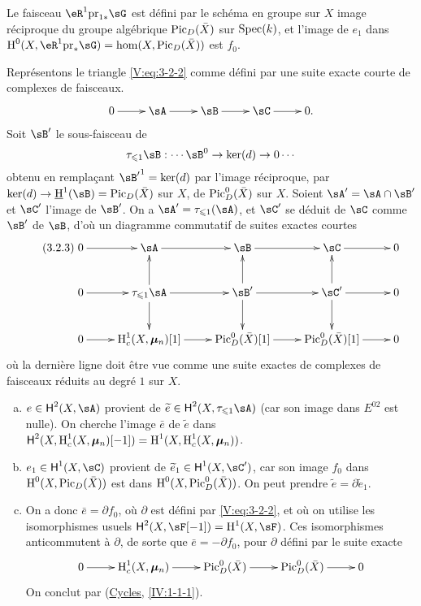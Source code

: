 Le faisceau $\eR^1\pr_{1\ast}\sG$ est défini par le schéma en 
groupe sur $X$ image réciproque du groupe algébrique $\operatorname{Pic}_D(\bar X)$ sur 
$\operatorname{Spec}(k)$, et l'image de $e_1$ dans 
$\h^0(X,\eR^1\pr_\ast\sG) = \hom(X,\pic_D(\bar X))$ est $f_0$. 

Représentons le triangle \eqref{V:eq:3-2-2} comme défini par une suite 
exacte courte de complexes de faisceaux.
\[\xymatrix{
  0 \ar[r] 
    & \sA \ar[r] 
    & \sB \ar[r] 
    & \sC \ar[r] 
    & 0 \text{.}
}\]
Soit $\sB'$ le sous-faisceau de 
\[
  \tau_{\leqslant 1} \sB : \cdots \sB^0 \to \ker(d) \to 0 \cdots
\]
obtenu en remplaçant ${\sB'}^1=\ker(d)$ par l'image réciproque, par 
$\ker(d)\to \underline\h^1(\sB) = \pic_D(\bar X)$ sur $X$, de 
$\operatorname{Pic}_D^0(\bar X)$ sur $X$. Soient $\sA'=\sA\cap \sB'$ et $\sC'$ l'image de 
$\sB'$. On a $\sA'=\tau_{\leqslant 1}(\sA)$, et $\sC'$ se déduit de $\sC$ 
comme $\sB'$ de $\sB$, d'où un diagramme commutatif de suites exactes courtes 
\begin{equation*}\tag{3.2.3}\label{V:eq:3-2-3}
\xymatrix{
  0 \ar[r] 
    & \sA \ar[r] 
    & \sB \ar[r] 
    & \sC \ar[r] 
    & 0 \\
  0 \ar[r] 
    & \tau_{\leqslant 1} \sA \ar[r] \ar[u] \ar[d] 
    & \sB' \ar[r] \ar[u] \ar[d] 
    & \sC' \ar[r] \ar[u] \ar[d] 
    & 0 \\
  0 \ar[r] 
    & \h_c^1(X,\dmu_n)[1] \ar[r] 
    & \pic_D^0(\bar X)[1] \ar[r] 
    & \pic_D^0(\bar X)[1] \ar[r] 
    & 0
}
\end{equation*}
où la dernière ligne doit être vue comme une suite exactes de complexes 
de faisceaux réduits au degré $1$ sur $X$. 
\begin{enumerate}[a)]
  \item $e\in \hh^2(X,\sA)$ provient de 
    $\widetilde e\in \hh^2(X,\tau_{\leqslant 1}\sA)$ (car son image dans 
    $E^{02}$ est nulle). On cherche l'image $\bar e$ de $\widetilde e$ dans 
    $\operatorname{\mathsf{H}}^2(X,\operatorname{H}_c^1(X,{\bm\mu}_n)[-1]) = \operatorname{H}^1(X,\operatorname{H}_c^1(X,{\bm\mu}_n))$.
  \item $e_1\in \hh^1(X,\sC)$ provient de $\widetilde e_1\in \hh^1(X,\sC')$, 
    car son image $f_0$ dans $\operatorname{H}^0(X,\operatorname{Pic}_D(\bar X))$ est dans 
    $\operatorname{H}^0(X,\operatorname{Pic}_D^0(\bar X))$. On peut prendre 
    $\widetilde e=\partial \widetilde e_1$. 
  \item On a donc $\bar e = \partial f_0$, où $\partial $ est défini par 
    \eqref{V:eq:3-2-2}, et où on utilise les isomorphismes usuels 
    $\hh^2(X,\sF[-1]) = \h^1(X,\sF)$. Ces isomorphismes anticommutent à 
    $\partial$, de sorte que $\bar e=-\partial f_0$, pour $\partial$ défini 
    par le suite exacte 
    \[\xymatrix{
      0 \ar[r] 
        & \h_c^1(X,\dmu_n) \ar[r] 
        & \pic_D^0(\bar X) \ar[r] 
        & \pic_D^0(\bar X) \ar[r] 
        & 0 
    }\]
    On conclut par (\hyperref[IV]{Cycles}, \ref{IV:1-1-1}). 
\end{enumerate}






